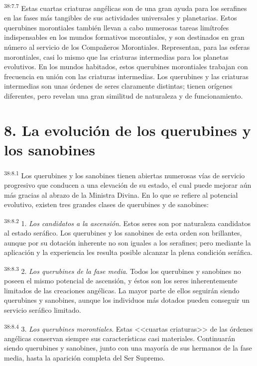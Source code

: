 \par
\textsuperscript{38:7.7} Estas cuartas criaturas angélicas son de una gran ayuda para los serafines en las fases más tangibles de sus actividades universales y planetarias. Estos querubines morontiales también llevan a cabo numerosas tareas limítrofes indispensables en los mundos formativos morontiales, y son destinados en gran número al servicio de los Compañeros Morontiales. Representan, para las esferas morontiales, casi lo mismo que las criaturas intermedias para los planetas evolutivos. En los mundos habitados, estos querubines morontiales trabajan con frecuencia en unión con las criaturas intermedias. Los querubines y las criaturas intermedias son unas órdenes de seres claramente distintas; tienen orígenes diferentes, pero revelan una gran similitud de naturaleza y de funcionamiento.

\section*{8. La evolución de los querubines y los sanobines}
\par
\textsuperscript{38:8.1} Los querubines y los sanobines tienen abiertas numerosas vías de servicio progresivo que conducen a una elevación de su estado, el cual puede mejorar aún más gracias al abrazo de la Ministra Divina. En lo que se refiere al potencial evolutivo, existen tres grandes clases de querubines y de sanobines:

\par
\textsuperscript{38:8.2} 1. \textit{Los candidatos a la ascensión}. Estos seres son por naturaleza candidatos al estado seráfico. Los querubines y los sanobines de esta orden son brillantes, aunque por su dotación inherente no son iguales a los serafines; pero mediante la aplicación y la experiencia les resulta posible alcanzar la plena condición seráfica.

\par
\textsuperscript{38:8.3} 2. \textit{Los querubines de la fase media}. Todos los querubines y sanobines no poseen el mismo potencial de ascensión, y éstos son los seres inherentemente limitados de las creaciones angélicas. La mayor parte de ellos seguirán siendo querubines y sanobines, aunque los individuos más dotados pueden conseguir un servicio seráfico limitado.

\par
\textsuperscript{38:8.4} 3. \textit{Los querubines morontiales}. Estas <<cuartas criaturas>> de las órdenes angélicas conservan siempre sus características casi materiales. Continuarán siendo querubines y sanobines, junto con una mayoría de sus hermanos de la fase media, hasta la aparición completa del Ser Supremo.

